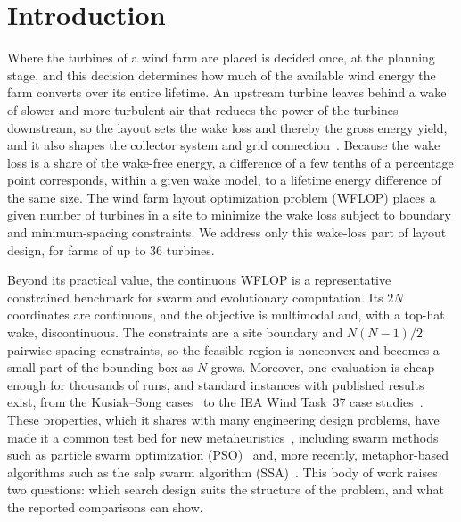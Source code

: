 \section{Introduction}
\label{sec:intro}

Where the turbines of a wind farm are placed is decided once, at the planning stage, and this decision determines how much of the available wind energy the farm converts over its entire lifetime. An upstream turbine leaves behind a wake of slower and more turbulent air that reduces the power of the turbines downstream, so the layout sets the wake loss and thereby the gross energy yield, and it also shapes the collector system and grid connection~\cite{Srikakulapu2018,Hou2019}. Because the wake loss is a share of the wake-free energy, a difference of a few tenths of a percentage point corresponds, within a given wake model, to a lifetime energy difference of the same size. The wind farm layout optimization problem (WFLOP) places a given number of turbines in a site to minimize the wake loss subject to boundary and minimum-spacing constraints. We address only this wake-loss part of layout design, for farms of up to 36 turbines.

Beyond its practical value, the continuous WFLOP is a representative constrained benchmark for swarm and evolutionary computation. Its $2N$ coordinates are continuous, and the objective is multimodal and, with a top-hat wake, discontinuous. The constraints are a site boundary and $N(N-1)/2$ pairwise spacing constraints, so the feasible region is nonconvex and becomes a small part of the bounding box as $N$ grows. Moreover, one evaluation is cheap enough for thousands of runs, and standard instances with published results exist, from the Kusiak--Song cases~\cite{Kusiak2010} to the IEA Wind Task~37 case studies~\cite{Baker2019}. These properties, which it shares with many engineering design problems, have made it a common test bed for new metaheuristics~\cite{Azlan2021}, including swarm methods such as particle swarm optimization (PSO)~\cite{Pookpunt2013,Asaah2021} and, more recently, metaphor-based algorithms such as the salp swarm algorithm (SSA)~\cite{Mirjalili2017,Rezk2019}. This body of work raises two questions: which search design suits the structure of the problem, and what the reported comparisons can show.

